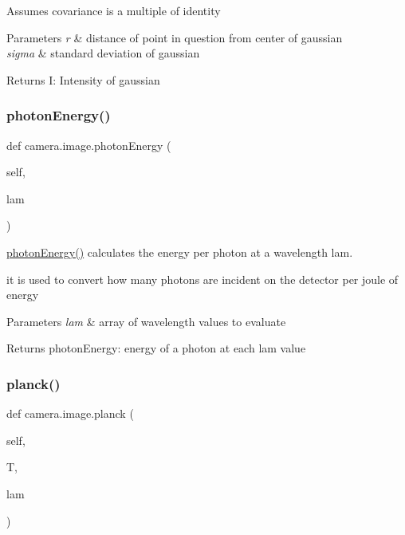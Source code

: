 Assumes covariance is a multiple of identity 
\begin{DoxyParams}{Parameters}
{\em r} & distance of point in question from center of gaussian \\
\hline
{\em sigma} & standard deviation of gaussian \\
\hline
\end{DoxyParams}
\begin{DoxyReturn}{Returns}
I\+: Intensity of gaussian 
\end{DoxyReturn}
\mbox{\label{classcamera_1_1image_a9e19e8ea8758f1cb262ca7e048e1e056}} 
\subsubsection{\texorpdfstring{photon\+Energy()}{photonEnergy()}}
{\footnotesize\ttfamily def camera.\+image.\+photon\+Energy (\begin{DoxyParamCaption}\item[{}]{self,  }\item[{}]{lam }\end{DoxyParamCaption})}



\hyperlink{classcamera_1_1image_a9e19e8ea8758f1cb262ca7e048e1e056}{photon\+Energy()} calculates the energy per photon at a wavelength lam. 

it is used to convert how many photons are incident on the detector per joule of energy 
\begin{DoxyParams}{Parameters}
{\em lam} & array of wavelength values to evaluate \\
\hline
\end{DoxyParams}
\begin{DoxyReturn}{Returns}
photon\+Energy\+: energy of a photon at each lam value 
\end{DoxyReturn}
\mbox{\label{classcamera_1_1image_a9ea76ebff6206130cfbbe8e45fcf0ca6}} 
\subsubsection{\texorpdfstring{planck()}{planck()}}
{\footnotesize\ttfamily def camera.\+image.\+planck (\begin{DoxyParamCaption}\item[{}]{self,  }\item[{}]{T,  }\item[{}]{lam }\end{DoxyParamCaption})}




